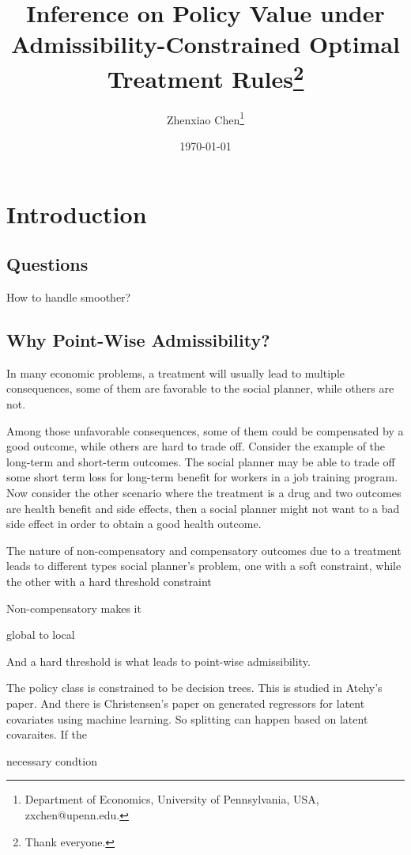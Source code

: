 \documentclass[12pt]{article}
\title{Inference on Policy Value under Admissibility-Constrained Optimal Treatment Rules\thanks{Thank everyone.}}
\author{Zhenxiao Chen\thanks{Department of Economics, University of Pennsylvania,
USA, zxchen@upenn.edu.}}
\date{\today}
\newcommand{\1}{\mathbf{1}}
\begin{document}
\maketitle

\begin{abstract}
\end{abstract}

\tableofcontents

\section{Introduction}
\subsection{Questions}
How to handle smoother?

\subsection{Why Point-Wise Admissibility?}
In many economic problems, a treatment will usually lead to multiple consequences, some of them are favorable to the social planner, while others are not.

Among those unfavorable consequences, some of them could be compensated by a good outcome, while others are hard to trade off. Consider the example of the long-term and short-term outcomes. The social planner may be able to trade off some short term loss for long-term benefit for workers in a job training program. Now consider the other scenario where the treatment is a drug and two outcomes are health benefit and side effects, then a social planner might not want to a bad side effect in order to obtain a good health outcome.

The nature of non-compensatory and compensatory outcomes due to a treatment leads to different types social planner's problem, one with a soft constraint, while the other with a hard threshold constraint

Non-compensatory makes it

global to local

And a hard threshold is what leads to point-wise admissibility.

The policy class is constrained to be decision trees. This is studied in Atehy's paper. And there is Christensen's paper on generated regressors for latent covariates using machine learning. So splitting can happen based on latent covaraites. If the 

necessary condtion 
\end{document}
